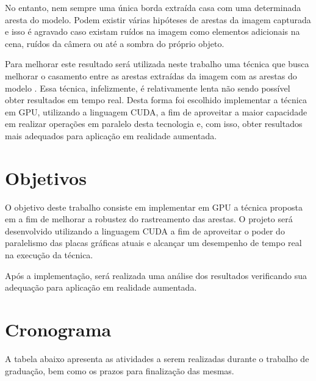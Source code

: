 \documentclass[a4paper, 12pt]{article}
\begin{document}
No entanto, nem sempre uma única borda extraída casa com uma determinada aresta do modelo. Podem existir várias hipóteses de arestas da imagem capturada e isso é agravado caso existam ruídos na imagem como elementos adicionais na cena, ruídos da câmera ou até a sombra do próprio objeto.

Para melhorar este resultado será utilizada neste trabalho uma técnica que busca melhorar o casamento entre as arestas extraídas da imagem com as arestas do modelo \cite{celine}. Essa técnica, infelizmente, é relativamente lenta não sendo possível obter resultados em tempo real. Desta forma foi escolhido implementar a técnica em GPU, utilizando a linguagem CUDA, a fim de aproveitar a maior capacidade em realizar operações em paralelo desta tecnologia \cite{cuda} e, com isso, obter resultados mais adequados para aplicação em realidade aumentada.

\section{Objetivos}

O objetivo deste trabalho consiste em implementar em GPU a técnica proposta em \cite{celine} a fim de melhorar a robustez do rastreamento das arestas. O projeto será desenvolvido utilizando a linguagem CUDA a fim de aproveitar o poder do paralelismo das placas gráficas atuais e alcançar um desempenho de tempo real na execução da técnica.

Após a implementação, será realizada uma análise dos resultados verificando sua adequação para aplicação em realidade aumentada.

\section{Cronograma}

A tabela abaixo apresenta as atividades a serem realizadas durante o trabalho de graduação, bem como os prazos para finalização das mesmas.
\end{document}
